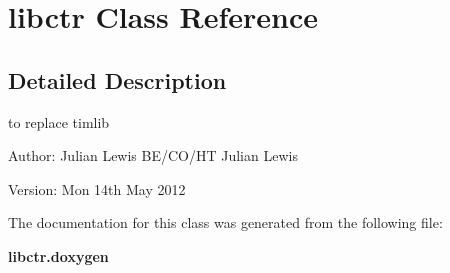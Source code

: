 \section{libctr Class Reference}
\label{classlibctr}


\subsection{Detailed Description}
to replace timlib \begin{Desc}
\item[Author:]Julian Lewis BE/CO/HT Julian Lewis \end{Desc}
\begin{Desc}
\item[Version:]Mon 14th May 2012 \end{Desc}




The documentation for this class was generated from the following file:\begin{CompactItemize}
\item 
\bf{libctr.doxygen}\end{CompactItemize}
